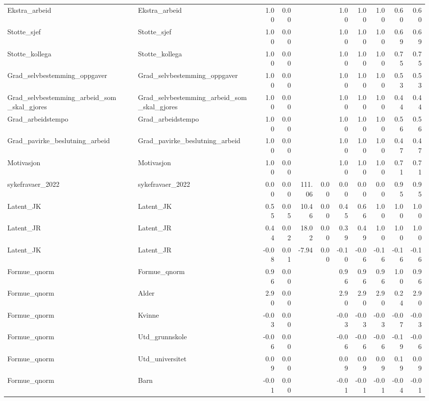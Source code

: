 \documentclass[
  12pt,
  a4paper,
  DIV=11,
  numbers=noendperiod]{scrartcl}
\begin{document}
\begin{table}[ht]
\begin{tabular}{llllrrrrrrrrr}
  Ekstra\_arbeid & ~~ & Ekstra\_arbeid &  & 1.00 & 0.00 &  &  & 1.00 & 1.00 & 1.00 & 0.60 & 0.60 \\ 
  Stotte\_sjef & ~~ & Stotte\_sjef &  & 1.00 & 0.00 &  &  & 1.00 & 1.00 & 1.00 & 0.69 & 0.69 \\ 
  Stotte\_kollega & ~~ & Stotte\_kollega &  & 1.00 & 0.00 &  &  & 1.00 & 1.00 & 1.00 & 0.75 & 0.75 \\ 
  Grad\_selvbestemming\_oppgaver & ~~ & Grad\_selvbestemming\_oppgaver &  & 1.00 & 0.00 &  &  & 1.00 & 1.00 & 1.00 & 0.53 & 0.53 \\ 
  Grad\_selvbestemming\_arbeid\_som\_skal\_gjores & ~~ & Grad\_selvbestemming\_arbeid\_som\_skal\_gjores &  & 1.00 & 0.00 &  &  & 1.00 & 1.00 & 1.00 & 0.44 & 0.44 \\ 
  Grad\_arbeidstempo & ~~ & Grad\_arbeidstempo &  & 1.00 & 0.00 &  &  & 1.00 & 1.00 & 1.00 & 0.56 & 0.56 \\ 
  Grad\_pavirke\_beslutning\_arbeid & ~~ & Grad\_pavirke\_beslutning\_arbeid &  & 1.00 & 0.00 &  &  & 1.00 & 1.00 & 1.00 & 0.47 & 0.47 \\ 
  Motivasjon & ~~ & Motivasjon &  & 1.00 & 0.00 &  &  & 1.00 & 1.00 & 1.00 & 0.71 & 0.71 \\ 
  sykefravaer\_2022 & ~~ & sykefravaer\_2022 &  & 0.00 & 0.00 & 111.06 & 0.00 & 0.00 & 0.00 & 0.00 & 0.95 & 0.95 \\ 
  Latent\_JK & ~~ & Latent\_JK &  & 0.55 & 0.05 & 10.46 & 0.00 & 0.45 & 0.66 & 1.00 & 1.00 & 1.00 \\ 
  Latent\_JR & ~~ & Latent\_JR &  & 0.44 & 0.02 & 18.02 & 0.00 & 0.39 & 0.49 & 1.00 & 1.00 & 1.00 \\ 
  Latent\_JK & ~~ & Latent\_JR &  & -0.08 & 0.01 & -7.94 & 0.00 & -0.10 & -0.06 & -0.16 & -0.16 & -0.16 \\ 
  Formue\_qnorm & ~~ & Formue\_qnorm &  & 0.96 & 0.00 &  &  & 0.96 & 0.96 & 0.96 & 1.00 & 0.96 \\ 
  Formue\_qnorm & ~~ & Alder &  & 2.90 & 0.00 &  &  & 2.90 & 2.90 & 2.90 & 0.24 & 2.90 \\ 
  Formue\_qnorm & ~~ & Kvinne &  & -0.03 & 0.00 &  &  & -0.03 & -0.03 & -0.03 & -0.07 & -0.03 \\ 
  Formue\_qnorm & ~~ & Utd\_grunnskole &  & -0.06 & 0.00 &  &  & -0.06 & -0.06 & -0.06 & -0.19 & -0.06 \\ 
  Formue\_qnorm & ~~ & Utd\_universitet &  & 0.09 & 0.00 &  &  & 0.09 & 0.09 & 0.09 & 0.19 & 0.09 \\ 
  Formue\_qnorm & ~~ & Barn &  & -0.01 & 0.00 &  &  & -0.01 & -0.01 & -0.01 & -0.04 & -0.01 \\ 

\end{tabular}
\end{table}
\end{document}
